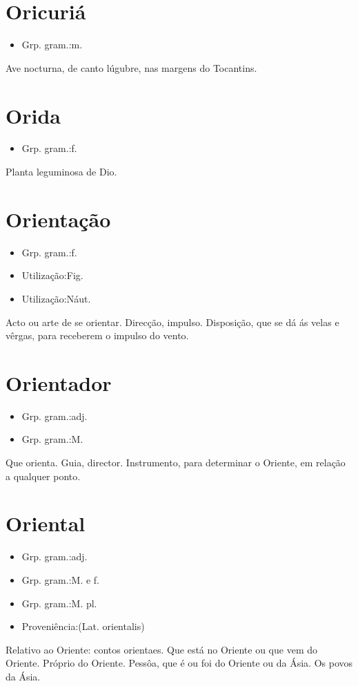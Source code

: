 \section{Oricuriá}
\begin{itemize}
\item {Grp. gram.:m.}
\end{itemize}
Ave nocturna, de canto lúgubre, nas margens do Tocantins.
\section{Orida}
\begin{itemize}
\item {Grp. gram.:f.}
\end{itemize}
Planta leguminosa de Dio.
\section{Orientação}
\begin{itemize}
\item {Grp. gram.:f.}
\end{itemize}
\begin{itemize}
\item {Utilização:Fig.}
\end{itemize}
\begin{itemize}
\item {Utilização:Náut.}
\end{itemize}
Acto ou arte de se orientar.
Direcção, impulso.
Disposição, que se dá ás velas e vêrgas, para receberem o impulso do vento.
\section{Orientador}
\begin{itemize}
\item {Grp. gram.:adj.}
\end{itemize}
\begin{itemize}
\item {Grp. gram.:M.}
\end{itemize}
Que orienta.
Guia, director.
Instrumento, para determinar o Oriente, em relação a qualquer ponto.
\section{Oriental}
\begin{itemize}
\item {Grp. gram.:adj.}
\end{itemize}
\begin{itemize}
\item {Grp. gram.:M.  e  f.}
\end{itemize}
\begin{itemize}
\item {Grp. gram.:M. pl.}
\end{itemize}
\begin{itemize}
\item {Proveniência:(Lat. \textunderscore orientalis\textunderscore )}
\end{itemize}
Relativo ao Oriente: \textunderscore contos orientaes\textunderscore .
Que está no Oriente ou que vem do Oriente.
Próprio do Oriente.
Pessôa, que é ou foi do Oriente ou da Ásia.
Os povos da Ásia.
